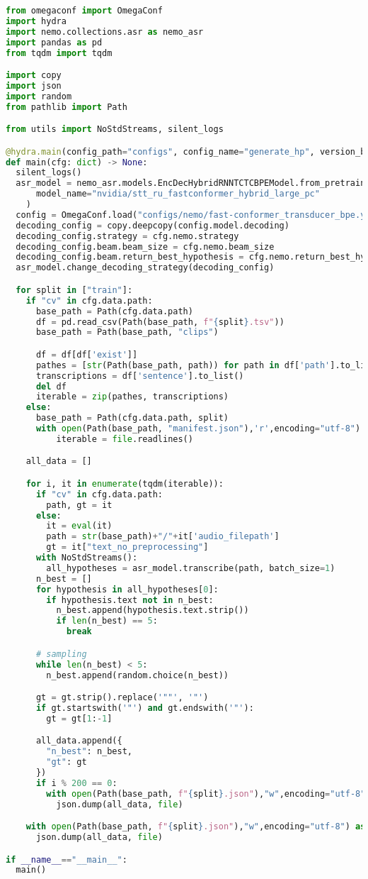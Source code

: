 \begin{lstlisting}[language=Python,label={lst:generate},caption=generate\_hypotheses.py,breaklines=true,]
from omegaconf import OmegaConf
import hydra
import nemo.collections.asr as nemo_asr
import pandas as pd
from tqdm import tqdm

import copy
import json
import random
from pathlib import Path

from utils import NoStdStreams, silent_logs

@hydra.main(config_path="configs", config_name="generate_hp", version_base="1.3")
def main(cfg: dict) -> None:
  silent_logs()
  asr_model = nemo_asr.models.EncDecHybridRNNTCTCBPEModel.from_pretrained(
      model_name="nvidia/stt_ru_fastconformer_hybrid_large_pc"
    )
  config = OmegaConf.load("configs/nemo/fast-conformer_transducer_bpe.yaml")
  decoding_config = copy.deepcopy(config.model.decoding)
  decoding_config.strategy = cfg.nemo.strategy
  decoding_config.beam.beam_size = cfg.nemo.beam_size
  decoding_config.beam.return_best_hypothesis = cfg.nemo.return_best_hypothesis
  asr_model.change_decoding_strategy(decoding_config)

  for split in ["train"]:
    if "cv" in cfg.data.path:
      base_path = Path(cfg.data.path)
      df = pd.read_csv(Path(base_path, f"{split}.tsv"))
      base_path = Path(base_path, "clips")

      df = df[df['exist']]
      pathes = [str(Path(base_path, path)) for path in df['path'].to_list()]
      transcriptions = df['sentence'].to_list()
      del df
      iterable = zip(pathes, transcriptions)
    else:
      base_path = Path(cfg.data.path, split)
      with open(Path(base_path, "manifest.json"),'r',encoding="utf-8") as file:
          iterable = file.readlines()

    all_data = []

    for i, it in enumerate(tqdm(iterable)):
      if "cv" in cfg.data.path:
        path, gt = it
      else:
        it = eval(it)
        path = str(base_path)+"/"+it['audio_filepath']
        gt = it["text_no_preprocessing"]
      with NoStdStreams():
        all_hypotheses = asr_model.transcribe(path, batch_size=1)
      n_best = []
      for hypothesis in all_hypotheses[0]:
        if hypothesis.text not in n_best:
          n_best.append(hypothesis.text.strip())
          if len(n_best) == 5:
            break

      # sampling
      while len(n_best) < 5:
        n_best.append(random.choice(n_best))

      gt = gt.strip().replace('""', '"')
      if gt.startswith('"') and gt.endswith('"'):
        gt = gt[1:-1]

      all_data.append({
        "n_best": n_best,
        "gt": gt
      })
      if i % 200 == 0:
        with open(Path(base_path, f"{split}.json"),"w",encoding="utf-8") as file:
          json.dump(all_data, file)

    with open(Path(base_path, f"{split}.json"),"w",encoding="utf-8") as file:
      json.dump(all_data, file)

if __name__=="__main__":
  main()
\end{lstlisting}
